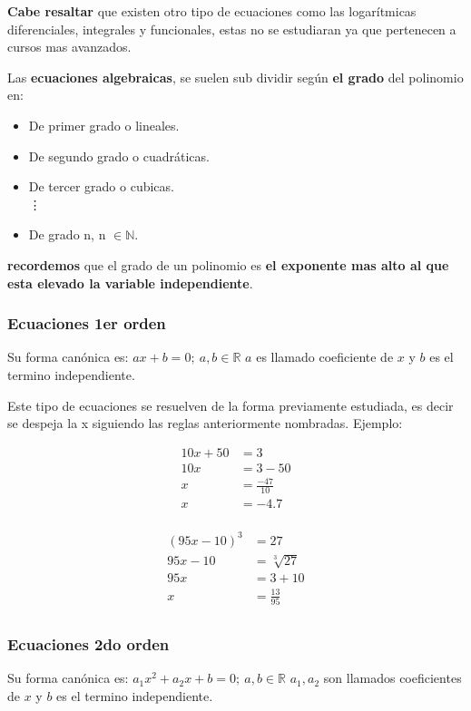     \textbf{Cabe resaltar} que existen otro tipo de ecuaciones como las logarítmicas
    diferenciales, integrales y funcionales, estas no se estudiaran ya que
    pertenecen a cursos mas avanzados.

    Las \textbf{ecuaciones algebraicas}, se suelen sub dividir según \textbf{el
    grado} del polinomio en:

    \begin{itemize}
        \item De primer grado o lineales.
        \item De segundo grado o cuadráticas.
        \item De tercer grado o cubicas.\\
        \vdots
        \item De grado n, n $\in\mathbb{N}$.
    \end{itemize}
    \textbf{recordemos} que el grado de un polinomio es
    \textbf{el exponente mas alto al que esta elevado la variable independiente}.

    \subsubsection*{Ecuaciones 1er orden} \label{Ecuaciones-1er-orden}
    Su forma canónica es: $ax+b=0;\ a,b\in\mathbb{R}$ $a$ es llamado coeficiente
    de $x$ y $b$ es el termino independiente.

    Este tipo de ecuaciones se resuelven de la forma previamente estudiada, es
    decir se despeja la x siguiendo las reglas anteriormente nombradas. Ejemplo:

    \begin{align*}
        10x +50 &= 3		\\
        10x &= 3-50 \\
        x &= \frac{-47}{10} \\
        x &= -4.7\\
    \end{align*}

   \begin{align*}
       (95x -10)^3 &= 27		\\
       95x -10 &= \sqrt[3]{27} \\
       95x &= 3 +10\\
       x &= \frac{13}{95} \\
   \end{align*}



    \subsubsection*{Ecuaciones 2do orden} \label{Ecuaciones-2do-orden}
    Su forma canónica es: $a_1x^2+a_2x+b=0;\ a,b\in\mathbb{R}$ $a_1,a_2$ son
    llamados coeficientes  de $x$ y $b$ es el termino independiente.

